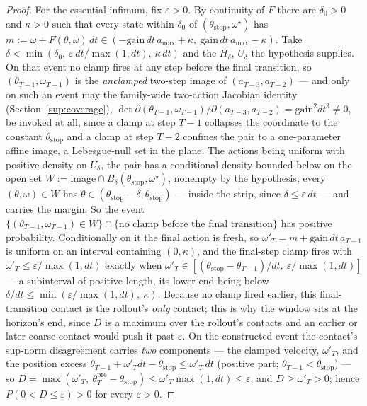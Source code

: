 \documentclass[11pt]{article}
\theoremstyle{definition}
\theoremstyle{remark}
\begin{document}
\begin{proof}
For the essential infimum, fix $\varepsilon > 0$. By continuity of $F$ there are $\delta_0 > 0$ and $\kappa > 0$ such that every state within $\delta_0$ of $(\theta_{\mathrm{stop}}, \omega^\star)$ has $m := \omega + F(\theta,\omega)\,dt \in (-\mathrm{gain}\,dt\,a_{\max} + \kappa,\ \mathrm{gain}\,dt\,a_{\max} - \kappa)$. Take $\delta < \min(\delta_0,\ \varepsilon\,dt/\max(1,dt),\ \kappa\,dt)$ and the $H_\delta$, $U_\delta$ the hypothesis supplies. On that event no clamp fires at any step before the final transition, so $(\theta_{T-1},\omega_{T-1})$ is the \emph{unclamped} two-step image of $(a_{T-3},a_{T-2})$ --- and only on such an event may the family-wide two-action Jacobian identity (Section~\ref{sup:coverage}), $\det \partial(\theta_{T-1},\omega_{T-1})/\partial(a_{T-3},a_{T-2}) = \mathrm{gain}^2 dt^3 \neq 0$, be invoked at all, since a clamp at step $T-1$ collapses the coordinate to the constant $\theta_{\mathrm{stop}}$ and a clamp at step $T-2$ confines the pair to a one-parameter affine image, a Lebesgue-null set in the plane. The actions being uniform with positive density on $U_\delta$, the pair has a conditional density bounded below on the open set $W := \mathrm{image} \cap B_\delta(\theta_{\mathrm{stop}},\omega^\star)$, nonempty by the hypothesis; every $(\theta,\omega) \in W$ has $\theta \in (\theta_{\mathrm{stop}} - \delta, \theta_{\mathrm{stop}})$ --- inside the strip, since $\delta \leq \varepsilon\,dt$ --- and carries the margin. So the event $\{(\theta_{T-1},\omega_{T-1}) \in W\} \cap \{\text{no clamp before the final transition}\}$ has positive probability. Conditionally on it the final action is fresh, so $\omega'_T = m + \mathrm{gain}\,dt\,a_{T-1}$ is uniform on an interval containing $(0, \kappa)$, and the final-step clamp fires with $\omega'_T \leq \varepsilon/\max(1,dt)$ exactly when $\omega'_T \in [(\theta_{\mathrm{stop}} - \theta_{T-1})/dt,\ \varepsilon/\max(1,dt)]$ --- a subinterval of positive length, its lower end being below $\delta/dt \leq \min(\varepsilon/\max(1,dt),\ \kappa)$. Because no clamp fired earlier, this final-transition contact is the rollout's \emph{only} contact; this is why the window sits at the horizon's end, since $D$ is a maximum over the rollout's contacts and an earlier or later coarse contact would push it past $\varepsilon$. On the constructed event the contact's sup-norm disagreement carries \emph{two} components --- the clamped velocity, $\omega'_T$, and the position excess $\theta_{T-1} + \omega'_T dt - \theta_{\mathrm{stop}} \leq \omega'_T\,dt$ (positive part; $\theta_{T-1} < \theta_{\mathrm{stop}}$) --- so $D = \max(\omega'_T,\ \theta^{\mathrm{pre}}_T - \theta_{\mathrm{stop}}) \leq \omega'_T \max(1, dt) \leq \varepsilon$, and $D \geq \omega'_T > 0$; hence $P(0 < D \leq \varepsilon) > 0$ for every $\varepsilon > 0$.
\end{proof}
\end{document}
